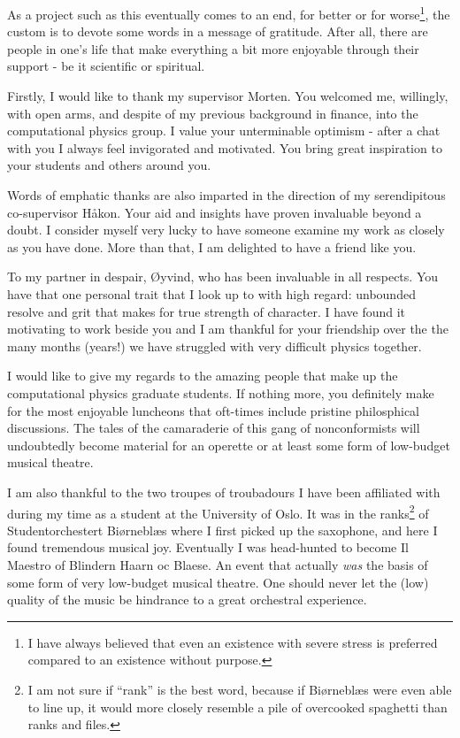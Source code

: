 As a project such as this eventually comes to an end, for better or for
worse\footnote{I have always believed that even an existence with severe stress is preferred
compared to an existence without purpose.},
the custom is to devote some words in a message of gratitude. After all, 
there are people in one's life that make everything a bit more enjoyable through their
support - be it scientific or spiritual.

Firstly, I would like to thank my supervisor Morten. You welcomed me, willingly, with open arms,
and despite of my previous background in finance, into the computational physics group. I value your 
unterminable optimism - after a chat with you I always feel invigorated and motivated. You bring 
great inspiration to your students and others around you.

Words of emphatic thanks are also imparted in the direction of my serendipitous co-supervisor Håkon.
Your aid and insights have proven invaluable beyond a doubt. I consider myself very lucky to have
someone examine my 
work as closely as you have done. More than that, I am delighted to have a friend like you.

To my partner in despair, Øyvind, who has been invaluable in all respects. You have that one personal 
trait that I look up to with high regard: unbounded resolve and grit that makes for true
strength of character. I have found it motivating to work beside you and I am thankful for your 
friendship over the the many months (years!) we have struggled with very difficult physics together.

I would like to give my regards to the amazing people that make up the computational physics graduate
students.
If nothing more, you definitely make for the most enjoyable luncheons that oft-times include
pristine
philosphical discussions. The tales of the camaraderie of this gang of nonconformists will 
undoubtedly become material for an operette or at least some form of low-budget musical theatre.

I am also thankful to the two troupes of troubadours I have been affiliated with during my time as a student 
at the University of Oslo. It was in the ranks\footnote{I am not sure if ``rank'' is the best word, because 
if Biørneblæs were even able to line up, it would more closely resemble a pile of overcooked spaghetti
than ranks and files.} of Studentorchestert Biørneblæs where I first 
picked up the saxophone, and here I found tremendous musical joy. Eventually I was head-hunted to 
become Il Maestro of Blindern Haarn oc Blaese. An event that actually \emph{was}
the basis of some form of very low-budget musical theatre. One should never let the (low) quality
of the music be hindrance to a great orchestral experience.

